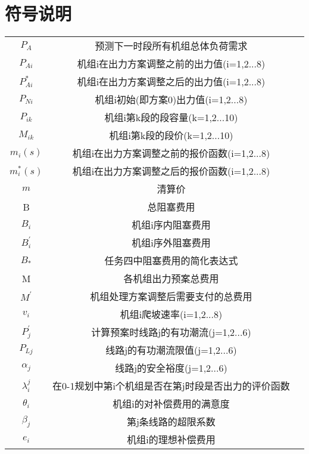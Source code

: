 \documentclass[12pt,a4paper]{ctexart}
\begin{document}
\section{符号说明}
\begin{center}
	\begin{longtable}{ccc}
		\toprule
		\hline 
	\rule{0pt}{15pt} 
	\makebox[0.2\textwidth][c]{符号}	&  \makebox[0.4\textwidth][c]{意义} \\ \hline \rule{0pt}{15pt}
	$P_{A}$	    & 预测下一时段所有机组总体负荷需求\\ \hline \rule{0pt}{15pt}
	$P_{Ai}$	& 机组i在出力方案调整之前的出力值(i=1,2...8) \\ \hline \rule{0pt}{15pt}
	$P_{Ai}^{*}$  & 机组i在出力方案调整之后的出力值(i=1,2...8) \\ \hline \rule{0pt}{15pt}
	$P_{Ni}$     &机组i初始(即方案0)出力值(i=1,2...8)   \\ \hline \rule{0pt}{15pt}
	$P_{ik}$	    & 机组i第k段的段容量(k=1,2...10)  \\ \hline \rule{0pt}{15pt}
	$M_{ik}$	    & 机组i第k段的段价(k=1,2...10) \\ \hline \rule{0pt}{15pt}
	$m_{i}{(s)}$         & 机组i在出力方案调整之前的报价函数(i=1,2...8) \\ \hline \rule{0pt}{15pt}
	$m_{i}^{*}{(s)}$     & 机组i在出力方案调整之后的报价函数(i=1,2...8) \\ \hline \rule{0pt}{15pt}
	$m$     & 清算价 \\ \hline \rule{0pt}{15pt}
	B	    & 总阻塞费用  \\ \hline \rule{0pt}{15pt}
	$B_{i}$ & 机组i序内阻塞费用 \\ \hline \rule{0pt}{15pt}
	$B_{i}^{'}$ &机组i序外阻塞费用 \\ \hline \rule{0pt}{15pt}
	$B_{*}$ &任务四中阻塞费用的简化表达式 \\ \hline \rule{0pt}{15pt}
	M       & 各机组出力预案总费用 \\ \hline \rule{0pt}{15pt}
	$M^{'}$  &机组处理方案调整后需要支付的总费用 \\ \hline \rule{0pt}{15pt}
	$v_{i}$  &机组i爬坡速率(i=1,2...8)  \\ \hline \rule{0pt}{15pt}
	$P_{j}^{'}$ &计算预案时线路j的有功潮流(j=1,2...6)\\ \hline \rule{0pt}{15pt}
	$P_{Lj}$ &线路j的有功潮流限值(j=1,2...6) \\ \hline \rule{0pt}{15pt}
	$\alpha_{j}$ &线路j的安全裕度(j=1,2...6) \\ \hline \rule{0pt}{15pt}
	$\lambda_{i}^{j}$ &在0-1规划中第i个机组是否在第j时段是否出力的评价函数  \\ \hline \rule{0pt}{15pt}
	$\theta_{i}$ &机组i的对补偿费用的满意度 \\ \hline \rule{0pt}{15pt}
	$\beta_{j}$  &第j条线路的超限系数 \\ \hline \rule{0pt}{15pt}
	$e_{i}$ &机组i的理想补偿费用 \\ \hline 
		\bottomrule
	\end{longtable}
\end{center}
\end{document}
